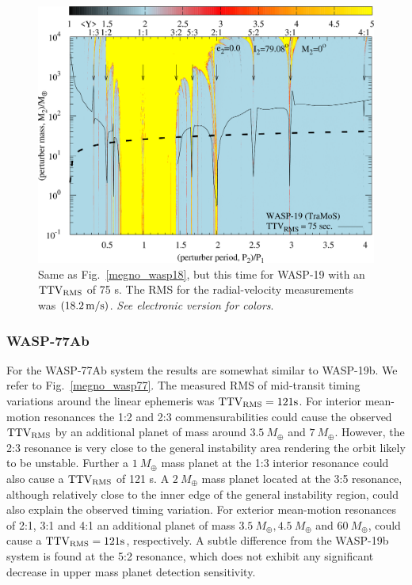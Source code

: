 \begin{figure}
\includegraphics[width=1.0\columnwidth]{imagenes/WASP19_TraMos_Map001_GIMP_scaled.png}
\caption{Same as Fig.~\ref{megno_wasp18}, but this time for WASP-19 with an $\rm TTV_{\rm RMS}$ of 75 s. The
RMS for the radial-velocity measurements was $(18.2\,\rm m/s)$. \emph{See electronic version for colors}.}
\label{megno_wasp19}
\end{figure}


\subsubsection{WASP-77Ab}
For the WASP-77Ab system the results are somewhat similar to WASP-19b. We refer to Fig.~\ref{megno_wasp77}. The measured RMS of mid-transit timing variations around the linear ephemeris was $\rm TTV_{\rm RMS}=121\rm s$. For interior mean-motion resonances the 1:2 and 2:3 commensurabilities could cause the observed $\rm TTV_{\rm RMS}$ by an additional planet of mass around $3.5~M_{\oplus}$ and $7~M_{\oplus}$. However, the 2:3 resonance is very close to the general instability area rendering the orbit likely to be unstable. Further a $1~M_{\oplus}$ mass planet at the 1:3 interior resonance could also cause a $\rm TTV_{\rm RMS}$ of 121 s. A $2~M_{\oplus}$ mass planet located at the 3:5 resonance, although relatively close to the inner edge of the general instability region, could also explain the observed timing variation. For exterior 
mean-motion resonances of 2:1, 3:1 and 4:1 an additional planet of mass $3.5~M_{\oplus}, 4.5~M_{\oplus}$ and $60~M_{\oplus}$, could cause a $\rm TTV_{\rm RMS}=121\rm s$, respectively. A subtle difference from the WASP-19b system is found at the 5:2 resonance, which does not exhibit any significant decrease in upper mass planet detection sensitivity.

